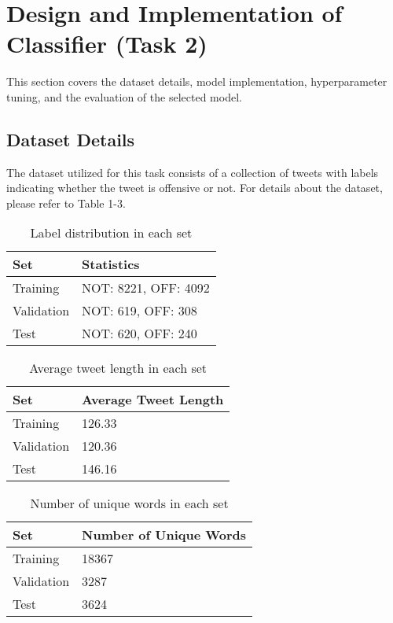 \documentclass[11pt]{article}
\begin{document}
\section{Design and Implementation of Classifier (Task 2)}

This section covers the dataset details, model implementation, hyperparameter tuning, and the evaluation of the selected model.

\subsection{Dataset Details}

The dataset utilized for this task consists of a collection of tweets with labels indicating whether the tweet is offensive or not. For details about the dataset, please refer to Table 1-3.
\begin{table}[h]
\centering
\begin{tabular}{|l|l|}
\hline
\textbf{Set} & \textbf{Statistics} \\ \hline
Training & NOT: 8221, OFF: 4092 \\ \hline
Validation & NOT: 619, OFF: 308 \\ \hline
Test & NOT: 620, OFF: 240 \\ \hline
\end{tabular}
\caption{Label distribution in each set}
\end{table}

\begin{table}[h]
\centering
\begin{tabular}{|l|l|}
\hline
\textbf{Set} & \textbf{Average Tweet Length} \\ \hline
Training & 126.33 \\ \hline
Validation & 120.36 \\ \hline
Test & 146.16 \\ \hline
\end{tabular}
\caption{Average tweet length in each set}
\end{table}

\begin{table}[h]
\centering
\begin{tabular}{|l|l|}
\hline
\textbf{Set} & \textbf{Number of Unique Words} \\ \hline
Training & 18367 \\ \hline
Validation & 3287 \\ \hline
Test & 3624 \\ \hline
\end{tabular}
\caption{Number of unique words in each set}
\end{table}
\end{document}

